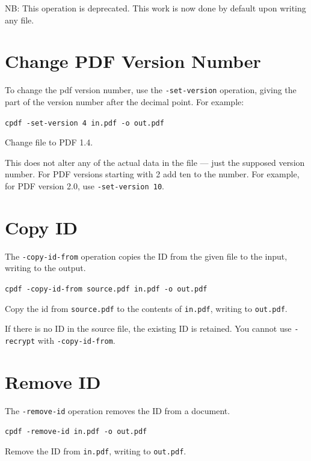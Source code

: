 \documentclass{book}
\begin{document}
\noindent NB: This operation is deprecated. This work is now done by default upon writing any file.

   \section{Change PDF Version Number}
   \label{setversion}
   To change the pdf version number, use the \texttt{-set-version} operation,
giving the part of the version number after the decimal point. For example:
  \begin{framed}
  \small\noindent\verb!cpdf -set-version 4 in.pdf -o out.pdf!

  \vspace{2.5mm}
  \noindent Change file to PDF 1.4.
  \end{framed} 
  \noindent This does not alter any of the actual data in the file ---
just the supposed version number. For PDF versions starting with 2 add ten to the number. For example, for PDF version 2.0, use \texttt{-set-version 10}.

  \section{Copy ID}
  The \texttt{-copy-id-from} operation copies the ID from the given file to the
input, writing to the output.
  \begin{framed}
  \small\noindent\verb!cpdf -copy-id-from source.pdf in.pdf -o out.pdf!

  \vspace{2.5mm}
  \noindent Copy the id from \texttt{source.pdf} to the contents of \texttt{in.pdf}, writing to \texttt{out.pdf}.
  \end{framed}
  \noindent If there is no ID in the source file, the existing ID is retained. You cannot use \texttt{-recrypt} with \texttt{-copy-id-from}.

\section{Remove ID}
  The \texttt{-remove-id} operation removes the ID from a document.
  \begin{framed}
  \small\noindent\verb!cpdf -remove-id in.pdf -o out.pdf!

  \vspace{2.5mm}
  \noindent Remove the ID from \texttt{in.pdf}, writing to \texttt{out.pdf}.
  \end{framed}
\end{document}
